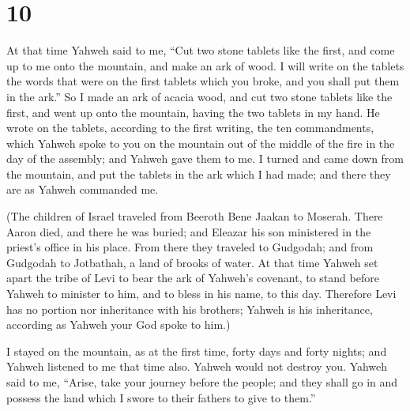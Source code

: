 \hypertarget{section-9}{%
\section{10}\label{section-9}}

 At that time Yahweh said to me, ``Cut two stone tablets
like the first, and come up to me onto the mountain, and make an ark of
wood.  I will write on the tablets the words that were on
the first tablets which you broke, and you shall put them in the ark.''
 So I made an ark of acacia wood, and cut two stone
tablets like the first, and went up onto the mountain, having the two
tablets in my hand.  He wrote on the tablets, according to
the first writing, the ten commandments, which Yahweh spoke to you on
the mountain out of the middle of the fire in the day of the assembly;
and Yahweh gave them to me.  I turned and came down from
the mountain, and put the tablets in the ark which I had made; and there
they are as Yahweh commanded me.

 (The children of Israel traveled from Beeroth Bene Jaakan
to Moserah. There Aaron died, and there he was buried; and Eleazar his
son ministered in the priest's office in his place.  From
there they traveled to Gudgodah; and from Gudgodah to Jotbathah, a land
of brooks of water.  At that time Yahweh set apart the
tribe of Levi to bear the ark of Yahweh's covenant, to stand before
Yahweh to minister to him, and to bless in his name, to this day.
 Therefore Levi has no portion nor inheritance with his
brothers; Yahweh is his inheritance, according as Yahweh your God spoke
to him.)

 I stayed on the mountain, as at the first time, forty
days and forty nights; and Yahweh listened to me that time also. Yahweh
would not destroy you.  Yahweh said to me, ``Arise, take
your journey before the people; and they shall go in and possess the
land which I swore to their fathers to give to them.''

